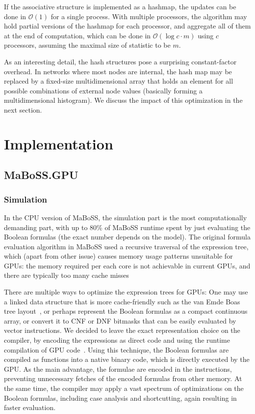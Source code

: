 \documentclass[a4paper,num-refs]{oup-contemporary}
\begin{document}
If the associative structure is implemented as a hashmap, the updates can be done in $\mathcal{O}(1)$ for a single process. With multiple processors, the algorithm may hold partial versions of the hashmap for each processor, and aggregate all of them at the end of computation, which can be done in $\mathcal{O}(\log{c} \cdot m)$ using $c$ processors, assuming the maximal size of statistic to be $m$.

As an interesting detail, the hash structures pose a surprising constant-factor overhead. In networks where most nodes are internal, the hash map may be replaced by a fixed-size multidimensional array that holds an element for all possible combinations of external node values (basically forming a multidimensional histogram). We discuss the impact of this optimization in the next section.

\section{Implementation}\label{sec:implementation}

\subsection{MaBoSS.GPU}

\subsubsection{Simulation}

In the CPU version of MaBoSS, the simulation part is the most computationally demanding part, with up to 80\% of MaBoSS runtime spent by just evaluating the Boolean formulas (the exact number depends on the model). The original formula evaluation algorithm in MaBoSS used a recursive traversal of the expression tree, which (apart from other issue) causes memory usage patterns unsuitable for GPUs: the memory required per each core is not achievable in current GPUs, and there are typically too many cache misses~\cite{karlsson2000prefetching}

There are multiple ways to optimize the expression trees for GPUs: One may use a linked data structure that is more cache-friendly such as the van Emde Boas tree layout~\cite{van1975preserving}, or perhaps represent the Boolean formulas as a compact continuous array, or convert it to CNF or DNF bitmasks that can be easily evaluated by vector instructions. We decided to leave the exact representation choice on the compiler, by encoding the expressions as direct code and using the runtime compilation of GPU code~\cite{nvrtc}. Using this technique, the Boolean formulas are compiled as functions into a native binary code, which is directly executed by the GPU. As the main advantage, the formulae are encoded in the instructions, preventing unnecessary fetches of the encoded formulas from other memory. At the same time, the compiler may apply a vast spectrum of optimizations on the Boolean formulas, including case analysis and shortcutting, again resulting in faster evaluation.
\end{document}
